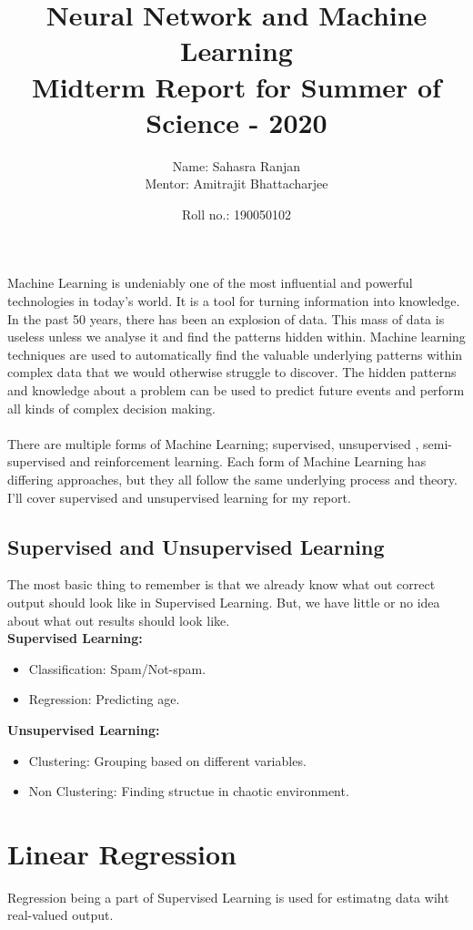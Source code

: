\documentclass[12pt, A4]{report}
\title{\textbf{Neural Network and Machine Learning}\\\large{Midterm Report for Summer of Science - 2020}}
\author{Name: Sahasra Ranjan\\Mentor: Amitrajit Bhattacharjee}
\date{Roll no.: 190050102}
\begin{document}
\begin{titlepage}
\maketitle
\end{titlepage}

Machine Learning is undeniably one of the most influential and powerful technologies in today’s world. It is a tool for turning information into knowledge. In the past 50 years, there has been an explosion of data. This mass of data is useless unless we analyse it and find the patterns hidden within. Machine learning techniques are used to automatically find the valuable underlying patterns within complex data that we would otherwise struggle to discover. The hidden patterns and knowledge about a problem can be used to predict future events and perform all kinds of complex decision making.\\\\
There are multiple forms of Machine Learning; supervised, unsupervised , semi-supervised and reinforcement learning. Each form of Machine Learning has differing approaches, but they all follow the same underlying process and theory. I'll cover supervised and unsupervised learning for my report.

\section*{Supervised and Unsupervised Learning}
  The most basic thing to remember is that we already know what out correct output should look like in Supervised Learning.
  But, we have little or no idea about what out results should look like.\\

  \textbf{Supervised Learning:}
  \begin{itemize}
    \item Classification: Spam/Not-spam. 
    \item Regression: Predicting age.
  \end{itemize}

  \textbf{Unsupervised Learning:}
  \begin{itemize}
    \item Clustering: Grouping based on different variables.
    \item Non Clustering: Finding structue in chaotic environment.
  \end{itemize}

\chapter{Linear Regression}
  Regression being a part of Supervised Learning is used for estimatng data wiht real-valued output.  
\end{document}
